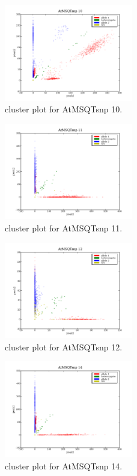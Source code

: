 \begin{figure}[H]
\includegraphics[width=0.5\textwidth]{figures/cluster_plot_AtMSQTsnp_10.png}
\caption{cluster plot for AtMSQTsnp 10.} \label{flAtMSQTsnp10}
\end{figure}

\begin{figure}[H]
\includegraphics[width=0.5\textwidth]{figures/cluster_plot_AtMSQTsnp_11.png}
\caption{cluster plot for AtMSQTsnp 11.} \label{flAtMSQTsnp11}
\end{figure}

\begin{figure}[H]
\includegraphics[width=0.5\textwidth]{figures/cluster_plot_AtMSQTsnp_12.png}
\caption{cluster plot for AtMSQTsnp 12.} \label{flAtMSQTsnp12}
\end{figure}

\begin{figure}[H]
\includegraphics[width=0.5\textwidth]{figures/cluster_plot_AtMSQTsnp_14.png}
\caption{cluster plot for AtMSQTsnp 14.} \label{flAtMSQTsnp14}
\end{figure}

